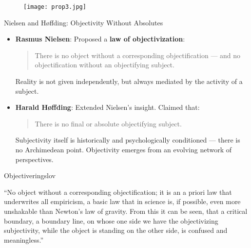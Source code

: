 \documentclass[fleqn]{beamer}
\begin{document}
\begin{frame}

\begin{figure}
\centering
\texttt{[image: prop3.jpg]}

\end{figure}
\end{frame}





\begin{frame}{Nielsen and Høffding: Objectivity Without Absolutes}

\begin{itemize}
  \item \textbf{Rasmus Nielsen}: Proposed a \textbf{law of objectivization}:
    \begin{quote}
      There is no object without a corresponding objectification — and
      no objectification without an objectifying subject.
    \end{quote}
    Reality is not given independently, but always mediated by the
    activity of a subject.

  \item \textbf{Harald Høffding}: Extended Nielsen’s insight. Claimed that:
    \begin{quote}
      There is no final or absolute objectifying subject.
    \end{quote}
    Subjectivity itself is historically and psychologically
    conditioned — there is no Archimedean point. Objectivity emerges
    from an evolving network of perspectives.
\end{itemize}

\end{frame}



\begin{frame}{Objectiveringslov}

  ``No object without a corresponding objectification; it is an a
  priori law that underwrites all empiricism, a basic law that in
  science is, if possible, even more unshakable than Newton's law of
  gravity. From this it can be seen, that a critical boundary, a
  boundary line, on whose one side we have the objectivizing
  subjectivity, while the object is standing on the other side, is
  confused and meaningless.'' \citep[41]{avg}

\end{frame}
\end{document}
